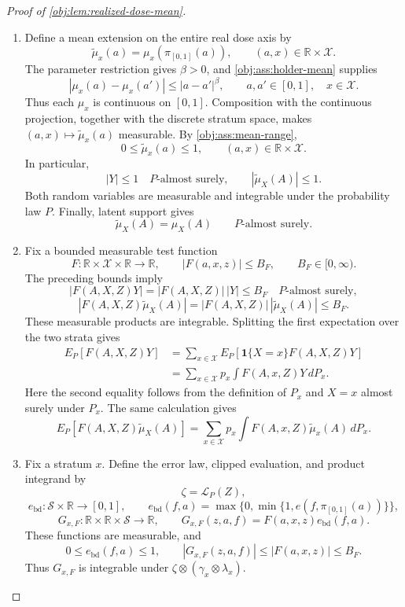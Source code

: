 \documentclass[11pt]{article}
\begin{document}
\begin{proof}[Proof of \cref{obj:lem:realized-dose-mean}]
\begin{enumerate}
\item Define a mean extension on the entire real dose axis by
\[
\widetilde\mu_x(a)=\mu_x(\pi_{[0,1]}(a)),
\qquad (a,x)\in\mathbb R\times\mathcal X.
\]
The parameter restriction gives \(\beta>0\), and
\cref{obj:ass:holder-mean} supplies
\[
|\mu_x(a)-\mu_x(a')|\le |a-a'|^\beta,
\qquad a,a'\in[0,1],\quad x\in\mathcal X.
\]
Thus each \(\mu_x\) is continuous on \([0,1]\). Composition with the continuous projection, together with the discrete stratum space, makes
\((a,x)\mapsto\widetilde\mu_x(a)\) measurable.
By \cref{obj:ass:mean-range},
\[
0\le\widetilde\mu_x(a)\le1,
\qquad (a,x)\in\mathbb R\times\mathcal X.
\]
In particular,
\[
|Y|\le1\quad P\text{-almost surely},
\qquad
|\widetilde\mu_X(A)|\le1.
\]
Both random variables are measurable and integrable under the probability law \(P\).
Finally, latent support gives
\[
\widetilde\mu_X(A)=\mu_X(A)
\qquad P\text{-almost surely}.
\]

\item Fix a bounded measurable test function
\[
F:\mathbb R\times\mathcal X\times\mathbb R\longrightarrow\mathbb R,
\qquad
|F(a,x,z)|\le B_F,
\qquad B_F\in[0,\infty).
\]
The preceding bounds imply
\[
|F(A,X,Z)Y|
=|F(A,X,Z)|\,|Y|\le B_F
\quad P\text{-almost surely},
\]
\[
|F(A,X,Z)\widetilde\mu_X(A)|
=|F(A,X,Z)|\,|\widetilde\mu_X(A)|\le B_F.
\]
These measurable products are integrable. Splitting the first expectation over the two strata gives
\[
\begin{aligned}
E_P[F(A,X,Z)Y]
&=\sum_{x\in\mathcal X}
 E_P[\mathbf1\{X=x\}F(A,X,Z)Y]\\
&=\sum_{x\in\mathcal X}p_x
 \int F(A,x,Z)Y\,dP_x.
\end{aligned}
\]
Here the second equality follows from the definition of \(P_x\) and \(X=x\) almost surely under \(P_x\). The same calculation gives
\[
E_P[F(A,X,Z)\widetilde\mu_X(A)]
=\sum_{x\in\mathcal X}p_x
 \int F(A,x,Z)\widetilde\mu_x(A)\,dP_x.
\]

\item Fix a stratum \(x\). Define the error law, clipped evaluation, and product integrand by
\[
\zeta=\mathcal L_P(Z),
\]
\[
e_{\mathrm{bd}}:\mathcal S\times\mathbb R\longrightarrow[0,1],
\qquad
e_{\mathrm{bd}}(f,a)
=\max\{0,\min\{1,e(f,\pi_{[0,1]}(a))\}\},
\]
\[
G_{x,F}:\mathbb R\times\mathbb R\times\mathcal S\longrightarrow\mathbb R,
\qquad
G_{x,F}(z,a,f)=F(a,x,z)e_{\mathrm{bd}}(f,a).
\]
These functions are measurable, and
\[
0\le e_{\mathrm{bd}}(f,a)\le1,
\qquad
|G_{x,F}(z,a,f)|
\le |F(a,x,z)|\le B_F.
\]
Thus \(G_{x,F}\) is integrable under \(\zeta\otimes(\gamma_x\otimes\lambda_x)\).


\end{enumerate}
\end{proof}
\end{document}
